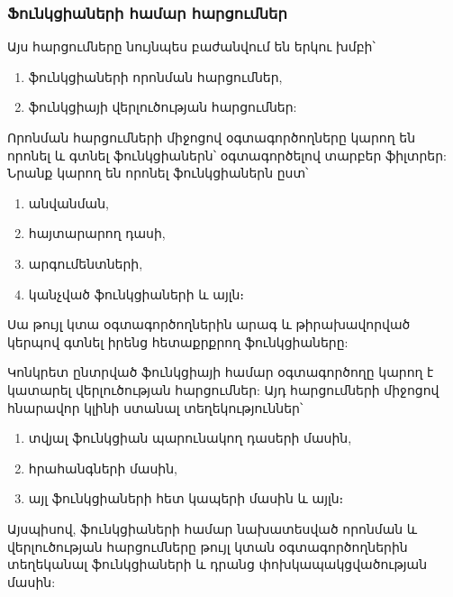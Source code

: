 \subsubsection*{Ֆունկցիաների համար հարցումներ}\label{subsubsec:functions}

Այս հարցումները նույնպես բաժանվում են երկու խմբի՝
\begin{enumerate}
    \item ֆունկցիաների որոնման հարցումներ,
    \item ֆունկցիայի վերլուծության հարցումներ:
\end{enumerate}

Որոնման հարցումների միջոցով օգտագործողները կարող են որոնել և գտնել ֆունկցիաներն՝ օգտագործելով տարբեր ֆիլտրեր:
Նրանք կարող են որոնել ֆունկցիաներն ըստ՝
\begin{enumerate}
    \item անվանման,
    \item հայտարարող դասի,
    \item արգումենտների,
    \item կանչված ֆունկցիաների և այլն։
\end{enumerate}

Սա թույլ կտա օգտագործողներին արագ և թիրախավորված կերպով գտնել իրենց հետաքրքրող ֆունկցիաները:

Կոնկրետ ընտրված ֆունկցիայի համար օգտագործողը կարող է կատարել վերլուծության հարցումներ: Այդ հարցումների միջոցով հնարավոր
կլինի ստանալ տեղեկություններ՝
\begin{enumerate}
    \item տվյալ ֆունկցիան պարունակող դասերի մասին,
    \item հրահանգների մասին,
    \item այլ ֆունկցիաների հետ կապերի մասին և այլն։
\end{enumerate}

Այսպիսով, ֆունկցիաների համար նախատեսված որոնման և վերլուծության հարցումները թույլ կտան օգտագործողներին տեղեկանալ ֆունկցիաների
և դրանց փոխկապակցվածության մասին:
